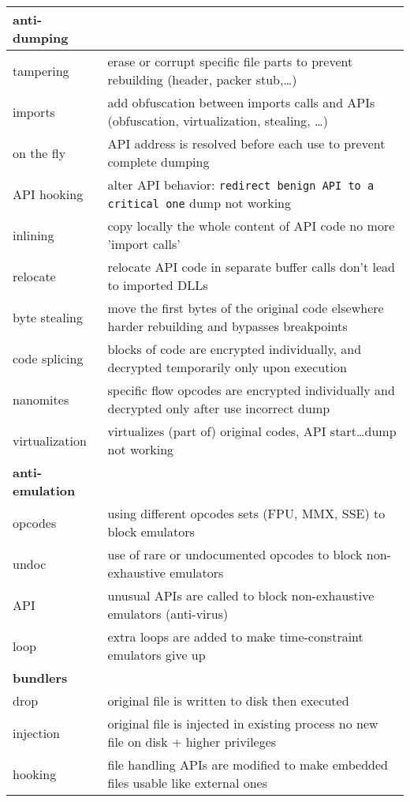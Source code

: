 \begin{tabular}{ll}
\midrule
{\bf anti-dumping} \\
\midrule
tampering		& erase or corrupt specific file parts to prevent rebuilding (header, packer stub,\ldots) \\
imports 		& add obfuscation between imports calls and APIs (obfuscation, virtualization, stealing, \ldots)\\
on the fly		& API address is resolved before each use to prevent complete dumping \\
API hooking		& alter API behavior: {\tt redirect benign API to a critical one} \ra dump not working \\
inlining		& copy locally the whole content of API code \ra no more 'import calls'\\
relocate		& relocate API code in separate buffer \ra calls don't lead to imported DLLs\\
byte stealing	& move the first bytes of the original code elsewhere \ra harder rebuilding and bypasses breakpoints\\
code splicing 	& blocks of code are encrypted individually, and decrypted temporarily only upon execution \\
nanomites		& specific flow opcodes are encrypted individually and decrypted only after use \ra incorrect dump\\
virtualization	& virtualizes (part of) original codes, API start\ldots \ra dump not working \\

\midrule
{\bf anti-emulation} \\
\midrule
opcodes		& using different opcodes sets (FPU, MMX, SSE) to block emulators\\
undoc			& use of rare or undocumented opcodes to block non-exhaustive emulators \\
API			& unusual APIs are called to block non-exhaustive emulators (anti-virus)\\
loop			& extra loops are added to make time-constraint emulators give up \\
\midrule
{\bf bundlers} \\
\midrule
drop			& original file is written to disk then executed \\
injection		& original file is injected in existing process \ra no new file on disk + higher privileges \\
hooking		& file handling APIs are modified to make embedded files usable like external ones\\

\bottomrule

\end{tabular}


\sig

